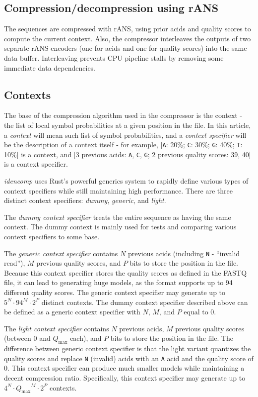 \subsection{Compression/decompression using rANS}\label{subsec:compression
/decompression-using-rans}
The sequences are compressed with rANS, using prior acids and quality scores
to compute the current context.
Also, the compressor interleaves the outputs of two separate rANS encoders
(one for acids and one for quality scores) into the same data buffer.
Interleaving prevents CPU pipeline stalls by removing some immediate data
dependencies.

\subsection{Contexts}\label{subsec:contexts}
The base of the compression algorithm used in the compressor is the context -
the list of local symbol probabilities at a given position in the file.
In this article, a \emph{context} will mean such list of symbol probabilities,
and a \emph{context specifier} will be the description of a context itself - for
example, [\texttt{A}: 20\%; \texttt{C}: 30\%; \texttt{G}: 40\%; \texttt{T}:
10\%] is a context, and [3
previous acids: \texttt{A}, \texttt{C}, \texttt{G}; 2 previous quality
scores: 39, 40] is a context
specifier.

\emph{idencomp} uses Rust’s powerful generics system to rapidly define
various types
of context specifiers while still maintaining high performance.
There are three distinct context specifiers: \emph{dummy}, \emph{generic},
and \emph{light}.

The \emph{dummy context specifier} treats the entire sequence as having the same
context.
The dummy context is mainly used for tests and comparing various context
specifiers to some base.

The \emph{generic context specifier} contains $N$ previous acids (including
\texttt{N} - ``invalid
read''), $M$ previous quality scores, and $P$ bits to store the position in the
file.
Because this context specifier stores the quality scores as defined in the
FASTQ file, it can lead to generating huge models, as the format supports up
to 94 different quality scores.
The generic context specifier may generate up to $5^N \cdot 94^M \cdot 2^P$
distinct
contexts.
The dummy context specifier described above can be defined as a generic
context specifier with $N$, $M$, and $P$ equal to 0.

The \emph{light context specifier} contains $N$ previous acids, $M$ previous
quality scores (between 0 and $Q_{\text{max}}$ each), and $P$ bits to store the
position in the file.
The difference between generic context specifier is that the light
variant quantizes the quality scores and replace \texttt{N} (invalid) acids with
an \texttt{A} acid and the quality score of 0.
This context specifier can produce much smaller models while maintaining a
decent compression ratio.
Specifically, this context specifier may generate up to
$4^N \cdot {Q_\text{max}}^M \cdot 2^P$ contexts.

